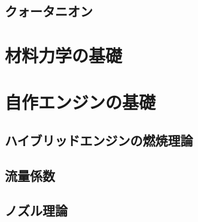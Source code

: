 \documentclass[uplatex,dvipdfmx,a4j,11pt]{jsreport}
\numberwithin{equation}{chapter}
\begin{document}
\section{クォータニオン}

\chapter{材料力学の基礎}

\chapter{自作エンジンの基礎}
\section{ハイブリッドエンジンの燃焼理論}
\section{流量係数}
\section{ノズル理論}



\end{document}
